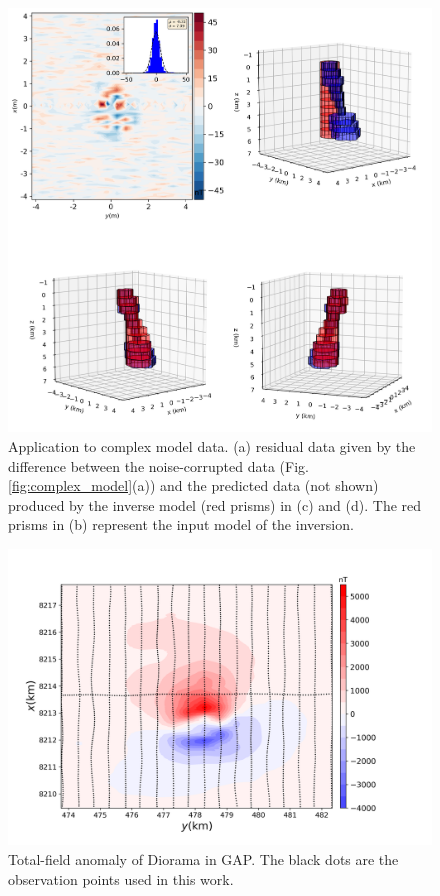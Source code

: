 \begin{figure}
    \centering
    \includegraphics[scale=.5]{figures/complex_results.png}
    \caption{Application to complex model data. (a) residual data given by the difference between the noise-corrupted data (Fig. \ref{fig:complex_model}(a)) and the predicted data (not shown) produced by the inverse model (red prisms) in (c) and (d). The red prisms in (b) represent the input model of the inversion.
}
    \label{fig:complex_result}
\end{figure}

\begin{figure}
    \centering
    \includegraphics[scale=.5]{figures/diorama_real_data.png}
    \caption{Total-field anomaly of Diorama in GAP. The black dots are the observation points used in this work.
}
    \label{fig:real_data}
\end{figure}

